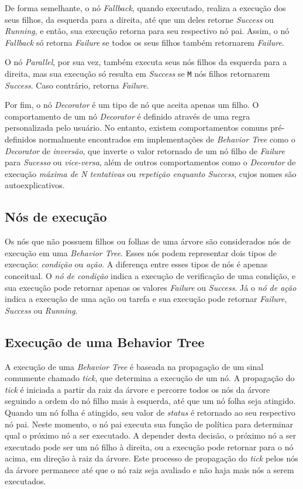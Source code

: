 \documentclass[conference]{IEEEtran}
\begin{document}
De forma semelhante, o nó \textit{Fallback}, quando executado, realiza a execução dos seus filhos, da esquerda para a direita, até que um deles retorne \textit{Success} ou \textit{Running}, e então, sua execução retorna para seu respectivo nó pai. Assim, o nó \textit{Fallback} só retorna \textit{Failure} se todos os seus filhos também retornarem \textit{Failure}.

O nó \textit{Parallel}, por sua vez, também executa seus nós filhos da esquerda para a direita, mas sua execução só resulta em \textit{Success} se \texttt{M} nós filhos retornarem \textit{Success}. Caso contrário, retorna \textit{Failure}.

Por fim, o nó \textit{Decorator} é um tipo de nó que aceita apenas um filho. O comportamento de um nó \textit{Decorator} é definido através de uma regra personalizada pelo usuário. No entanto, existem comportamentos comuns pré-definidos normalmente encontrados em implementações de \textit{Behavior Tree} como o \textit{Decorator} de \textit{inversão}, que inverte o valor retornado de um nó filho de \textit{Failure} para \textit{Sucesso} ou \textit{vice-versa}, além de outros comportamentos como o \textit{Decorator} de execução \textit{máxima de N tentativas} ou \textit{repetição enquanto Success}, cujos nomes são autoexplicativos.

\subsection{Nós de execução}

Os nós que não possuem filhos ou folhas de uma árvore são considerados nós de execução em uma \textit{Behavior Tree}. Esses nós podem representar dois tipos de execução: \textit{condição} ou \textit{ação}. A diferença entre esses tipos de nós é apenas conceitual. O \textit{nó de condição} indica a execução de verificação de uma condição, e sua execução pode retornar apenas os valores \textit{Failure} ou \textit{Success}. Já o \textit{nó de ação} indica a execução de uma ação ou tarefa e sua execução pode retornar \textit{Failure}, \textit{Success} ou \textit{Running}.

\subsection{Execução de uma Behavior Tree}

A execução de uma \textit{Behavior Tree} é baseada na propagação de um sinal comumente chamado \textit{tick}, que determina a execução de um nó. A propagação do \textit{tick} é iniciada a partir da raiz da árvore e percorre todos os nós da árvore seguindo a ordem do nó filho mais à esquerda, até que um nó folha seja atingido. Quando um nó folha é atingido, seu valor de \textit{status} é retornado ao seu respectivo nó pai. Neste momento, o nó pai executa sua função de política para determinar qual o próximo nó a ser executado. A depender desta decisão, o próximo nó a ser executado pode ser um nó filho à direita, ou a execução pode retornar para o nó acima, em direção à raiz da árvore. Este processo de propagação do \textit{tick} pelos nós da árvore permanece até que o nó raiz seja avaliado e não haja mais nós a serem executados.
\end{document}

